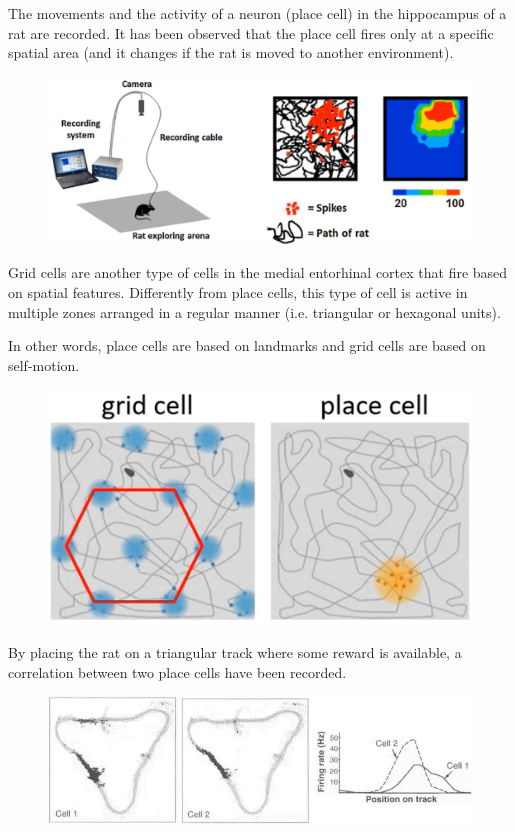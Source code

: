 \begin{description}
        \begin{casestudy}
            The movements and the activity of a neuron (place cell) in the hippocampus of a rat are recorded.
            It has been observed that the place cell fires only at a specific spatial area (and it changes if the rat is moved to another environment).
            \begin{figure}[H]
                \centering
                \includegraphics[width=0.55\linewidth]{./img/hippocampus_replay1.png}
            \end{figure}

            \indenttbox
            \begin{remark}
                Grid cells are another type of cells in the medial entorhinal cortex that fire based on spatial features.
                Differently from place cells, this type of cell is active in multiple zones arranged in a regular manner (i.e. triangular or hexagonal units).

                In other words, place cells are based on landmarks and grid cells are based on self-motion.
                \begin{figure}[H]
                    \centering
                    \includegraphics[width=0.25\linewidth]{./img/grid_place_cell.png}
                \end{figure}
            \end{remark}

            By placing the rat on a triangular track where some reward is available, a correlation between two place cells have been recorded.
            \begin{figure}[H]
                \centering
                \includegraphics[width=0.6\linewidth]{./img/hippocampus_replay2.png}
            \end{figure}


\end{casestudy}
\end{description}
